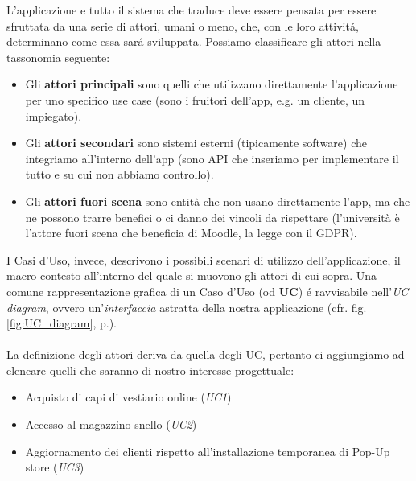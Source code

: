 \documentclass[12pt]{article}
\begin{document}
L'applicazione e tutto il sistema che traduce deve essere pensata per essere sfruttata da una serie di attori, umani o meno, che, con le loro attivit\'a, determinano come essa sar\'a sviluppata. Possiamo classificare gli attori nella tassonomia seguente:
\begin{itemize}
    \item Gli \textbf{attori principali} sono quelli che utilizzano direttamente l’applicazione per uno specifico use case (sono i fruitori dell’app, e.g. un cliente, un impiegato).
    \item Gli \textbf{attori secondari} sono sistemi esterni (tipicamente software) che integriamo all’interno dell’app (sono API che inseriamo per implementare il tutto e su cui non abbiamo controllo).
    \item Gli \textbf{attori fuori scena} sono entità che non usano direttamente l’app, ma che ne possono trarre benefici o ci danno dei vincoli da rispettare (l’università è l’attore fuori scena che beneficia di Moodle, la legge con il GDPR).
\end{itemize}

I Casi d'Uso, invece, descrivono i possibili scenari di utilizzo dell'applicazione, il macro-contesto all'interno del quale si muovono gli attori di cui sopra. Una comune rappresentazione grafica di un Caso d'Uso (od \textbf{UC}) \'e ravvisabile nell'{\em UC diagram}, ovvero un'\textit{interfaccia} astratta della nostra applicazione (cfr. fig. \ref{fig:UC_diagram}, p.\pageref{fig:UC_diagram}).
\\
\\
La definizione degli attori deriva da quella degli UC, pertanto ci aggiungiamo ad elencare quelli che saranno di nostro interesse progettuale:
\begin{itemize}
    \item Acquisto di capi di vestiario online (\textit{UC1})
    \item Accesso al magazzino snello (\textit{UC2})
    \item Aggiornamento dei clienti rispetto all'installazione temporanea di Pop-Up store (\textit{UC3})
\end{itemize}
\end{document}
